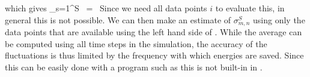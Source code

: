 \eeq
which gives
\sum_{s=1}^S \left[X_{m,n}^s \sum_{s'=s+1}^S \sum_{i=m}^n x_i^{s'}\,+\,\sum_{i=m}^n x_i^s \sum_{s'=s+1}^S x_i^{s'}\right] ~=~\Delta\sigma 
\eeq
Since we need all data points $i$ to evaluate this, in general this is not possible.
We can then make an estimate of $\sigma_{m,n}^S$ using only the data points that 
are available using the left hand side of . While the average can
be computed using all time steps in the simulation, the accuracy of the
fluctuations is thus limited by the frequency with which energies are saved.
Since this can be easily done with a program such as  this is not 
built-in in {\gromacs}.

